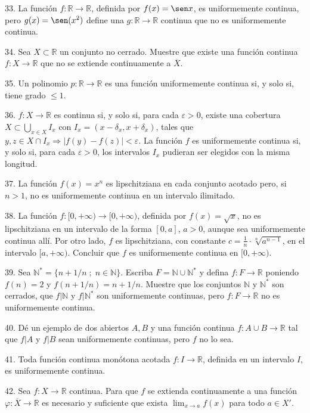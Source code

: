 \documentclass[12pt,oneside]{book}
\begin{document}
33. La función \(f: \mathbb{R} \to \mathbb{R}\), definida por \(f(x) = \sen x\), es uniformemente continua, pero \(g(x) = \sen(x^2)\) define una \(g: \mathbb{R} \to \mathbb{R}\) continua que no es uniformemente continua.

34. Sea \(X \subset \mathbb{R}\) un conjunto no cerrado. Muestre que existe una función continua \(f: X \to \mathbb{R}\) que no se extiende continuamente a \(\overline{X}\).

35. Un polinomio \(p: \mathbb{R} \to \mathbb{R}\) es una función uniformemente continua si, y solo si, tiene grado \(\leq 1\).

36. \(f: X \to \mathbb{R}\) es continua si, y solo si, para cada \(\varepsilon > 0\), existe una cobertura \(X \subset \bigcup_{x \in X} I_x\) con \(I_x = (x - \delta_x, x + \delta_x)\), tales que \(y, z \in X \cap I_x \Rightarrow |f(y) - f(z)| < \varepsilon\). La función \(f\) es uniformemente continua si, y solo si, para cada \(\varepsilon > 0\), los intervalos \(I_x\) pudieran ser elegidos con la misma longitud.

37. La función \(f(x) = x^n\) es lipschitziana en cada conjunto acotado pero, si \(n > 1\), no es uniformemente continua en un intervalo ilimitado.

38. La función \(f: [0, +\infty) \to [0, +\infty)\), definida por \(f(x) = \sqrt{x}\), no es lipschitziana en un intervalo de la forma \([0, a]\), \(a > 0\), aunque sea uniformemente continua allí. Por otro lado, \(f\) es lipschitziana, con constante \(c = \frac{1}{n} \cdot \sqrt[n]{a^{n-1}}\), en el intervalo \([a, +\infty)\). Concluir que \(f\) es uniformemente continua en \([0, +\infty)\).

39. Sea \(\mathbb{N}^* = \{n + 1/n \; ; \; n \in \mathbb{N}\}\). Escriba \(F = \mathbb{N} \cup \mathbb{N}^*\) y defina \(f: F \to \mathbb{R}\) poniendo \(f(n) = 2\) y \(f(n + 1/n) = n + 1/n\). Muestre que los conjuntos \(\mathbb{N}\) y \(\mathbb{N}^*\) son cerrados, que \(f|\mathbb{N}\) y \(f|\mathbb{N}^*\) son uniformemente continuas, pero \(f: F \to \mathbb{R}\) no es uniformemente continua.

40. Dé un ejemplo de dos abiertos \(A, B\) y una función continua \(f: A \cup B \to \mathbb{R}\) tal que \(f|A\) y \(f|B\) sean uniformemente continuas, pero \(f\) no lo sea.

41. Toda función continua monótona acotada \(f: I \to \mathbb{R}\), definida en un intervalo \(I\), es uniformemente continua.

42. Sea \(f: X \to \mathbb{R}\) continua. Para que \(f\) se extienda continuamente a una función \(\varphi: \overline{X} \to \mathbb{R}\) es necesario y suficiente que exista \(\lim_{x \to a} f(x)\) para todo \(a \in X'\).
\end{document}
